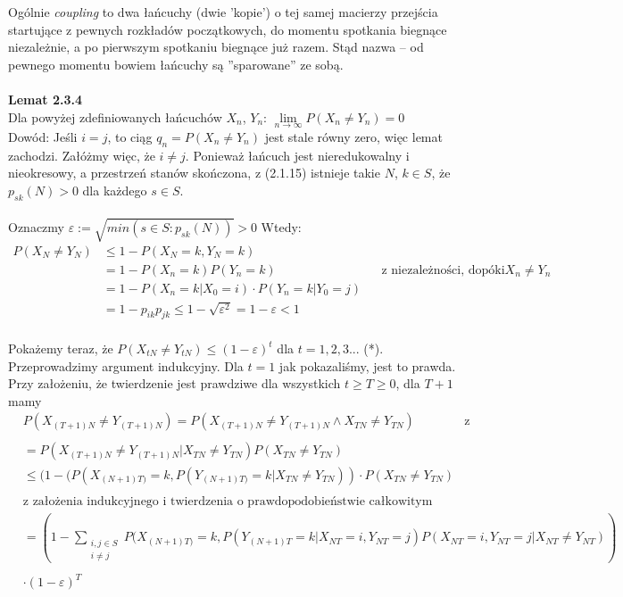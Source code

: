 \documentclass[a4paper]{article}
\begin{document}
Ogólnie \textit{coupling} to dwa łańcuchy (dwie 'kopie') o tej samej macierzy przejścia startujące z pewnych rozkładów początkowych, do momentu spotkania biegnące niezależnie, a po pierwszym spotkaniu biegnące już razem. Stąd nazwa – od pewnego momentu bowiem łańcuchy są ''sparowane'' ze sobą. 
\\
\\
\textbf{Lemat 2.3.4}\\
Dla powyżej zdefiniowanych łańcuchów $X_n$, $Y_n$: $\lim\limits_{n \to \infty} P(X_n \neq Y_n) = 0$\\
Dowód: Jeśli $i = j$, to ciąg $q_n = P(X_n \neq Y_n)$ jest stale równy zero, więc lemat zachodzi. Załóżmy więc, że $i \neq j$. Ponieważ łańcuch jest nieredukowalny i nieokresowy, a przestrzeń stanów skończona, z (2.1.15) istnieje takie $N$, $k \in S$, że $p_{sk}(N) > 0$ dla każdego $s \in S$.\\\\
Oznaczmy $\varepsilon := \sqrt{min(s \in S: p_{sk}(N))} > 0$ Wtedy: 
\begin{align*}
P(X_N \neq Y_N) &\leq 1 - P(X_N = k, Y_N = k) \\
&= 1 - P(X_n = k)P(Y_n = k) && \text{z niezależności, dopóki $X_n \neq Y_n$} \\
&= 1 - P(X_n = k|X_0 = i) \cdot P(Y_n = k|Y_0 = j) \\
&= 1 - p_{ik}p_{jk} \leq 1 - \sqrt{\varepsilon^2} = 1 - \varepsilon < 1
\end{align*}
\\
Pokażemy teraz, że $P(X_{tN} \neq Y_{tN}) \leq (1-\varepsilon)^t$ dla $t=1,2,3...$ (*). Przeprowadzimy argument indukcyjny. Dla $t = 1$ jak pokazaliśmy, jest to prawda. Przy założeniu, że twierdzenie jest prawdziwe dla wszystkich $t \geq T \geq 0$, dla $T+1$ mamy 
\begin{align*}
    &P(X_{(T+1)N} \neq Y_{(T+1)N}) = P(X_{(T+1)N} \neq Y_{(T+1)N} \land X_{TN} \neq Y_{TN})
    &\text{z konstrukcji łańcuchów:}\\\\
    &= P(X_{(T+1)N} \neq Y_{(T+1)N} | X_{TN} \neq Y_{TN})P(X_{TN} \neq Y_{TN})\\
    &\leq (1 - (P(X_{(N+1)T)} = k, P(Y_{(N+1)T)} = k  |  X_{TN} \neq Y_{TN})) \cdot P(X_{TN} \neq Y_{TN}) \\\\
    &\text{z  założenia indukcyjnego i twierdzenia o prawdopodobieństwie całkowitym}
    \end{align*}
    \begin{align*}
    & = \left(1 - \sum\limits_{\substack{i,j \in S\\i\neq j}} P(X_{(N+1)T)} = k, P(Y_{(N+1)T} = k | X_{NT} = i, Y_{NT} = j)P(X_{NT} = i, Y_{NT} = j | X_{NT} \neq Y_{NT})\right)\\\\
    &\cdot (1 - \varepsilon)^T
    \end{align*}
\end{document}
